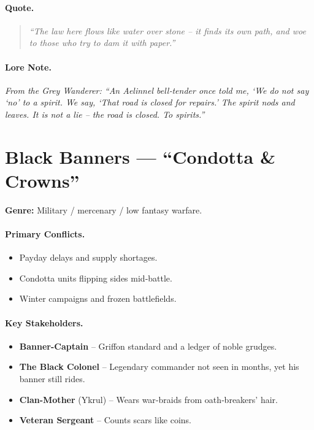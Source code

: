 \paragraph{Quote.}
\begin{quote}
\emph{“The law here flows like water over stone – it finds its own path, and woe to those who try to dam it with paper.”}
\end{quote}

\paragraph{Lore Note.}
\emph{From the Grey Wanderer: “An Aelinnel bell‑tender once told me, ‘We do not say ‘no’ to a spirit. We say, ‘That road is closed for repairs.’ The spirit nods and leaves. It is not a lie – the road is closed. To spirits.”}

\section{Black Banners — “Condotta \& Crowns”}
\textbf{Genre:} Military / mercenary / low fantasy warfare.

\paragraph{Primary Conflicts.}
\begin{itemize}
  \item Payday delays and supply shortages.
  \item Condotta units flipping sides mid‑battle.
  \item Winter campaigns and frozen battlefields.
\end{itemize}

\paragraph{Key Stakeholders.}
\begin{itemize}
  \item \textbf{Banner-Captain} – Griffon standard and a ledger of noble grudges.
  \item \textbf{The Black Colonel} – Legendary commander not seen in months, yet his banner still rides.
  \item \textbf{Clan-Mother} (Ykrul) – Wears war‑braids from oath‑breakers’ hair.
  \item \textbf{Veteran Sergeant} – Counts scars like coins.
\end{itemize}

